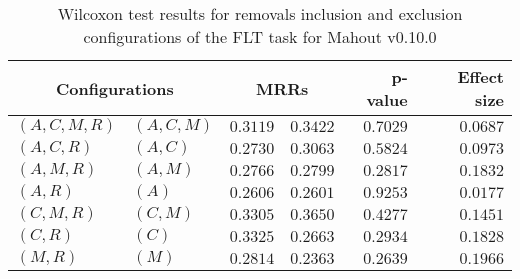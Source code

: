 
\begin{table}
\begin{spacing}{1.2}
\centering
\caption{Wilcoxon test results for removals inclusion and exclusion configurations of the FLT task for Mahout v0.10.0}
\label{table:versus-wilcox-mahout-flt-removals}
\begin{tabular}{ll|rr|rr}
\toprule
      \multicolumn{2}{c|}{Configurations} &          \multicolumn{2}{c|}{MRRs} &       p-value & Effect size \\
\midrule
 $(A,C,M,R)$ &  $(A,C,M)$ & $0.3119$ & $0.3422$ & $0.7029$ &    $0.0687$ \\
   $(A,C,R)$ &    $(A,C)$ & $0.2730$ & $0.3063$ & $0.5824$ &    $0.0973$ \\
   $(A,M,R)$ &    $(A,M)$ & $0.2766$ & $0.2799$ & $0.2817$ &    $0.1832$ \\
     $(A,R)$ &      $(A)$ & $0.2606$ & $0.2601$ & $0.9253$ &    $0.0177$ \\
   $(C,M,R)$ &    $(C,M)$ & $0.3305$ & $0.3650$ & $0.4277$ &    $0.1451$ \\
     $(C,R)$ &      $(C)$ & $0.3325$ & $0.2663$ & $0.2934$ &    $0.1828$ \\
     $(M,R)$ &      $(M)$ & $0.2814$ & $0.2363$ & $0.2639$ &    $0.1966$ \\
\bottomrule
\end{tabular}

\end{spacing}
\end{table}

